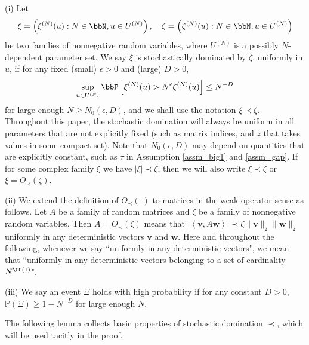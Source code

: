 \begin{definition}\label{stoch_domination}
(i) Let
\[\xi=\left(\xi^{(N)}(u):N\in\bbN, u\in U^{(N)}\right),\hskip 10pt \zeta=\left(\zeta^{(N)}(u):N\in\bbN, u\in U^{(N)}\right)\]
be two families of nonnegative random variables, where $U^{(N)}$ is a possibly $N$-dependent parameter set. We say $\xi$ is stochastically dominated by $\zeta$, uniformly in $u$, if for any fixed (small) $\epsilon>0$ and (large) $D>0$, 
\[\sup_{u\in U^{(N)}}\bbP\left[\xi^{(N)}(u)>N^\epsilon\zeta^{(N)}(u)\right]\le N^{-D}\]
for large enough $N\ge N_0(\epsilon, D)$, and we shall use the notation $\xi\prec\zeta$. Throughout this paper, the stochastic domination will always be uniform in all parameters that are not explicitly fixed (such as matrix indices, and $z$ that takes values in some compact set). Note that $N_0(\epsilon, D)$ may depend on quantities that are explicitly constant, such as $\tau$ in Assumption \ref{assm_big1} and \eqref{assm_gap}. If for some complex family $\xi$ we have $|\xi|\prec\zeta$, then we will also write $\xi \prec \zeta$ or $\xi=O_\prec(\zeta)$.

(ii) We extend the definition of $O_\prec(\cdot)$ to matrices in the weak operator sense as follows. Let $A$ be a family of random matrices and $\zeta$ be a family of nonnegative random variables. Then $A=O_\prec(\zeta)$ means that $\left|\left\langle\mathbf v, A\mathbf w\right\rangle\right|\prec\zeta \| \mathbf v\|_2 \|\mathbf w\|_2 $ uniformly in any deterministic vectors $\mathbf v$ and $\mathbf w$. Here and throughout the following, whenever we say ``uniformly in any deterministic vectors", we mean that ``uniformly in any deterministic vectors belonging to a set of cardinality $N^{\OO(1)}$".

(iii) We say an event $\Xi$ holds with high probability if for any constant $D>0$, $\mathbb P(\Xi)\ge 1- N^{-D}$ for large enough $N$.
\end{definition}

The following lemma collects basic properties of stochastic domination $\prec$, which will be used tacitly in the proof.

